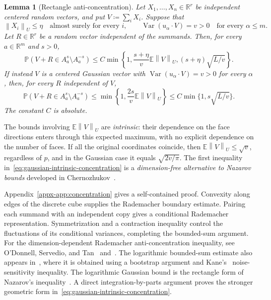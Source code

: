 \documentclass[11pt,letterpaper]{article}
\newtheorem{lemma}{Lemma}
\theoremstyle{remark}
\newcommand{\E}{\mathbb E}
\newcommand{\Pp}{\mathbb P}
\newcommand{\R}{\mathbb R}
\newcommand{\Var}{\operatorname{Var}}
\newcommand{\norm}[1]{\left\lVert#1\right\rVert}
\begin{document}
\begin{lemma}[Rectangle anti-concentration]\label{lem:concentration}
Let \(X_1,\ldots,X_n\in\R^r\) be independent centered random
vectors, and put \(V\coloneqq\sum_iX_i\). Suppose that
\[
 \norm{X_i}_U\le\eta\quad\text{almost surely for every }i,
 \qquad \Var(u_\alpha\cdot V)=v>0
                   \quad\text{for every }\alpha\le m.
\]
Let \(R\in\R^r\) be a random vector independent of the summands.
Then, for every \(a\in\R^m\) and \(s>0\),
\begin{equation}
 \Pp(V+R\in A_a^s\setminus A_a^{-s})
 \le C\min\left\{1,\frac{s+\eta}{v}\E\norm{V}_U,
                         (s+\eta)\sqrt{L/v}\right\}.
 \label{eq:bounded-intrinsic-concentration}
\end{equation}
If instead \(V\) is a centered Gaussian vector with
\(\Var(u_\alpha\cdot V)=v>0\) for every \(\alpha\), then, for
every \(R\) independent of \(V\),
\begin{equation}
 \Pp(V+R\in A_a^s\setminus A_a^{-s})
 \le\min\left\{1,\frac{2s}{v}\E\norm{V}_U\right\}
 \le C\min\{1,s\sqrt{L/v}\}.
 \label{eq:gaussian-intrinsic-concentration}
\end{equation}
The constant \(C\) is absolute.
\end{lemma}
The bounds involving \(\E\norm{V}_U\) are \emph{intrinsic}:
their dependence on the face directions enters through this expected
maximum, with no explicit dependence on the number of faces.
If all the original coordinates coincide, then
\(\E\norm{V}_U\le\sqrt v\), regardless of \(p\), and in the
Gaussian case it equals \(\sqrt{2v/\pi}\).
The first inequality in~\eqref{eq:gaussian-intrinsic-concentration}
is a \emph{dimension-free alternative to Nazarov bounds} developed in
Chernozhukov~\cite{ChernozhukovAC2026}.

Appendix~\ref{appx-app:concentration} gives a self-contained proof.
Convexity along edges of the discrete cube supplies the Rademacher
boundary estimate. Pairing each summand with an independent copy gives
a conditional Rademacher representation. Symmetrization and a contraction
inequality control the fluctuations of its conditional variances,
completing the bounded-sum argument. For the dimension-dependent Rademacher
anti-concentration inequality, see O'Donnell, Servedio, and
Tan~\cite{OST} and~\cite[Lemma~J.4]{CCKK2022}. The logarithmic bounded-sum
estimate also appears in~\cite[Lemma~2.1]{AL}, where it is obtained
using a bootstrap argument and Kane's~\cite{Kane} noise-sensitivity
inequality. The logarithmic Gaussian bound is the rectangle form of
Nazarov's inequality~\cite[Lemma~A.1]{CCK2017}. A direct
integration-by-parts argument proves the stronger geometric form
in~\eqref{eq:gaussian-intrinsic-concentration}.
\end{document}
